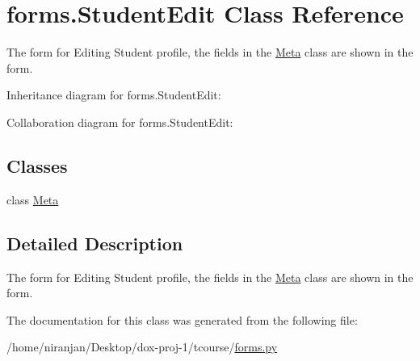 \hypertarget{classforms_1_1_student_edit}{}\section{forms.\+Student\+Edit Class Reference}
\label{classforms_1_1_student_edit}


The form for Editing Student profile, the fields in the \hyperlink{classforms_1_1_student_edit_1_1_meta}{Meta} class are shown in the form.  




Inheritance diagram for forms.\+Student\+Edit\+:


Collaboration diagram for forms.\+Student\+Edit\+:
\subsection*{Classes}
\begin{DoxyCompactItemize}
\item 
class \hyperlink{classforms_1_1_student_edit_1_1_meta}{Meta}
\end{DoxyCompactItemize}


\subsection{Detailed Description}
The form for Editing Student profile, the fields in the \hyperlink{classforms_1_1_student_edit_1_1_meta}{Meta} class are shown in the form. 

The documentation for this class was generated from the following file\+:\begin{DoxyCompactItemize}
\item 
/home/niranjan/\+Desktop/dox-\/proj-\/1/tcourse/\hyperlink{forms_8py}{forms.\+py}\end{DoxyCompactItemize}
